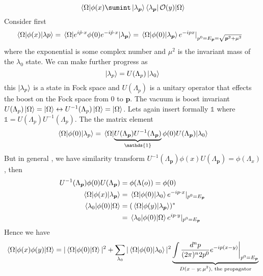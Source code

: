\begin{equation}
    \mel{\Omega}{\phi(x)  \sumint  \ket{\lambda_{\bm{p}}} \bra{\lambda_{\bm{p}}}  \mathcal{O}(y) }{\Omega}
\end{equation}
Consider first
\begin{align}
    \mel{\Omega}{\phi(x)}{\lambda{p}} & = \mel{\Omega}{e^{i\hat{p}\cdot x} \phi(0) e^{-i\hat{p}\cdot x} }{\lambda_{\bm{p}}} = \mel{\Omega}{\phi(0)}{\lambda_{\bm{p}}} e^{-ipx}|_{p^0 = E_{\bm{p}} = \sqrt{\bm{p}^2 +\mu^2} }
\end{align}
where the exponential is some complex number and $\mu^2$ is the invariant mass of the $\lambda_0$ state. We can make further progress as
\begin{equation}
    \ket{\lambda_p} = U(\Lambda_{p}) \ket{\lambda_0}
\end{equation}
this $\ket{\lambda_p}$ is a state in Fock space and $U(\Lambda_{p})$ is a unitary operator that effects the boost on the Fock space from $0$ to $\bm{p}$. The vacuum is boost invariant $U(\Lambda_p) \ket{\Omega} = \ket{\Omega} \leftrightarrow U^{-1} (\Lambda_{p}) \ket{\Omega}= \ket{\Omega}$. Lets again insert formally $\mathds{1}$ where $\mathds{1} = U(\Lambda_p)U^{-1} (\Lambda_{p})$. The the matrix element 
\begin{equation}
    \mel{\Omega}{\phi(0)}{\lambda_p} = \mel{\Omega}{ \underbrace{U(\Lambda_{\bm{p}})U^{-1} (\Lambda_{\bm{p}})}_\text{$\mathds{1}$} \phi(0) U(\Lambda_{\bm{p}})}{\lambda_0}
\end{equation}
But in general , we have similarity transform $U^{-1}(\Lambda_{\bm{p}}) \phi(x) U(\Lambda_{\bm{p}}) = \phi (\Lambda_x)$, then 
\begin{align}
    U^{-1} (\Lambda_{\bm{p}}) \phi(0) U(\Lambda_{\bm{p}}) & = \phi (\Lambda (o)) = \phi(0) \nonumber\\
    \mel{\Omega}{\phi(x)}{\lambda_{\bm{p}}} & =  \mel{\Omega}{\phi(0)}{\lambda_{0}} e^{-ip\cdot x} \vert_{p^0 = E_{\bm{p}}} \nonumber\\
    \mel{\lambda_{0}}{\phi(0)}{\Omega} & = (\mel{\Omega}{\phi(y)}{\lambda_{\bm{p}}})^{*} \nonumber\\
    & = \mel{\lambda_{0}}{\phi(0)}{\Omega} e^{ip\cdot y} \vert_{p^0 = E_{\bm{p}}}
\end{align}
Hence we have
\begin{align}
    \mel{\Omega}{ \phi(x) \phi(y) }{\Omega} = | \mel{\Omega}{\phi(0)}{\Omega}|^2 + \sum_{\lambda_0}   |\mel{\Omega}{ \phi(0) }{\lambda_0}|^2 \underbrace{\int \frac{d^n p}{(2\pi)^n 2p^0} e^{-ip(x - y)}  \bigg\vert_{p^0 = E_{\bm{p}}}}_\text{$D(x - y; \mu^2)$, the propagator}
\end{align}
